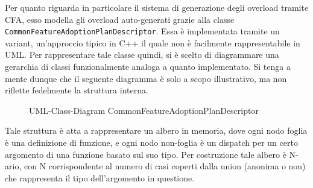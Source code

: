 Per quanto riguarda in particolare il sistema di generazione degli overload tramite CFA, esso modella gli overload auto-generati 
grazie alla classe \texttt{CommonFeatureAdoptionPlanDescriptor}. Essa è implementata tramite un variant, un'approccio tipico in C++
il quale non è facilmente rappresentabile in UML. Per rappresentare tale classe quindi, si è scelto di diagrammare una gerarchia 
di classi funzionalmente analoga a quanto implementato. Si tenga a mente dunque che il seguente diagramma è solo a scopo illustrativo,
ma non riflette fedelmente la struttura interna.

\begin{figure}[h]
\vspace{0.5cm}
\begin{adjustwidth}{-2cm}{-2cm} %
\begin{center}
\end{center}
\end{adjustwidth}
\caption{UML-Class-Diagram CommonFeatureAdoptionPlanDescriptor}
\end{figure}
\vspace{0.5cm}

Tale struttura è atta a rappresentare un albero in memoria, dove ogni nodo foglia è una definizione di funzione, 
e ogni nodo non-foglia è un dispatch per un certo argomento di una funzione basato sul suo tipo. Per costruzione tale albero è N-ario, con N corrispondente
al numero di casi coperti dalla union (anonima o non) che rappresenta il tipo dell'argomento in questione. \\